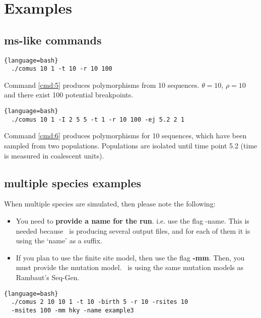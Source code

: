 \chapter{Examples}

\section{ms-like commands}

\begin{lstlisting}[label=cmd:5, caption={Simple ms command}]{language=bash}
  ./comus 10 1 -t 10 -r 10 100
\end{lstlisting}

Command \ref{cmd:5} produces polymorphisms from 10 sequences. $\theta = 10$, $\rho = 10$ and there exist 100 potential breakpoints. 


\begin{lstlisting}[label=cmd:6, caption={ms command with two populations}]{language=bash}
  ./comus 10 1 -I 2 5 5 -t 1 -r 10 100 -ej 5.2 2 1
\end{lstlisting}

Command \ref{cmd:6} produces polymorphisms for 10 sequences, which have been sampled from two populations. Populations are isolated until time point 5.2 (time is measured in coalescent units). 

\section{multiple species examples}

When multiple species are simulated, then please note the following:
\begin{itemize}
\item You need to {\bf provide a name for the run}. i.e. use the flag -name. This is needed because \comus\ is producing several output files, and for each of them it is using the `name' as a suffix. 
\item If you plan to use the finite site model, then use the flag {\bf -mm}. Then, you must provide the mutation model. \comus\ is using the same mutation models as Rambaut's Seq-Gen.
\end{itemize}

\begin{lstlisting}[label=cmd:7, caption={Two species, random phylogenetic tree}]{language=bash}
  ./comus 2 10 10 1 -t 10 -birth 5 -r 10 -rsites 10 
  -msites 100 -mm hky -name example3
\end{lstlisting}

